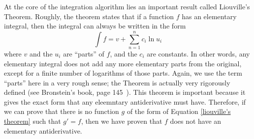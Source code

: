 At the core of the \gls{integration} algorithm lies an important result
called Liouville's Theorem.  Roughly, the theorem states that if a
function $f$ has an \gls{elementary} integral, then the integral can
always be written in the form
\begin{equation}
\label{liouville's theorem}
\int{f} = v + \sum_{n=1}^n{c_i\ln{u_i}}
\end{equation}
where $v$ and the $u_i$ are ``parts'' of $f$, and the $c_i$ are
constants.  In other words, any \gls{elementary} integral does not add
any more \gls{elementary} parts from the original, except for a finite
number of logarithms of those parts.  Again, we use the term ``parts''
here in a very rough sense; the Theorem is actually very rigorously
defined (see Bronstein's book, page 145~\cite{bronstein2005symbolic}). 
This theorem is important because it gives the exact form that any
eleemntary antiderivative must have. Therefore, if we can prove that
there is no function $g$ of the form of Equation \ref{liouville's
theorem} such that $g'=f$, then we have proven that $f$ does not have an
\gls{elementary} antiderivative. 